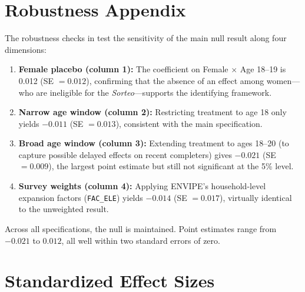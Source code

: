\documentclass[12pt]{article}
\begin{document}
\section{Robustness Appendix}
\label{app:robustness}

The robustness checks in  test the sensitivity of the main null result along four dimensions:

\begin{enumerate}
    \item \textbf{Female placebo (column 1):} The coefficient on Female $\times$ Age 18--19 is 0.012 (SE $= 0.012$), confirming that the absence of an effect among women---who are ineligible for the \textit{Sorteo}---supports the identifying framework.
    \item \textbf{Narrow age window (column 2):} Restricting treatment to age 18 only yields $-0.011$ (SE $= 0.013$), consistent with the main specification.
    \item \textbf{Broad age window (column 3):} Extending treatment to ages 18--20 (to capture possible delayed effects on recent completers) gives $-0.021$ (SE $= 0.009$), the largest point estimate but still not significant at the 5\% level.
    \item \textbf{Survey weights (column 4):} Applying ENVIPE's household-level expansion factors (\texttt{FAC\_ELE}) yields $-0.014$ (SE $= 0.017$), virtually identical to the unweighted result.
\end{enumerate}

\noindent Across all specifications, the null is maintained. Point estimates range from $-0.021$ to $0.012$, all well within two standard errors of zero.


\section{Standardized Effect Sizes}
\label{sec:sde}


\end{document}
